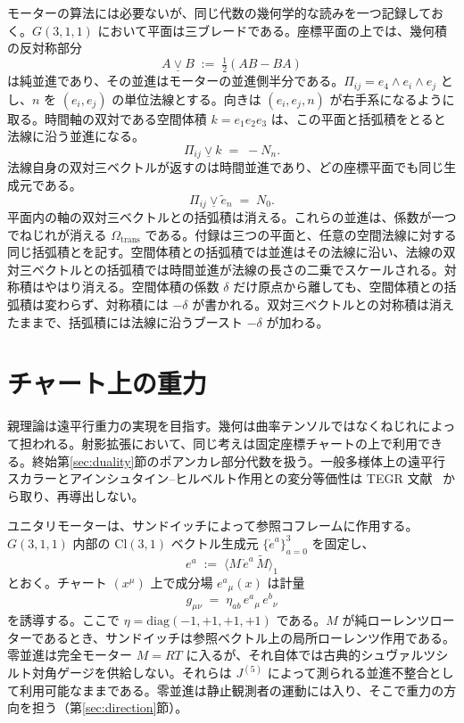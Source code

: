 \documentclass[a4paper]{article}
\begin{document}
モーターの算法には必要ないが、同じ代数の幾何学的な読みを一つ記録しておく。\(G(3,1,1)\) において平面は三ブレードである。座標平面の上では、幾何積の反対称部分
\[
A \mathbin{\underline{\vee}} B \;:=\; \tfrac12(AB-BA)
\]
は純並進であり、その並進はモーターの並進側半分である。\(\Pi_{ij}=e_{4}\wedge e_{i}\wedge e_{j}\) とし、\(n\) を \((e_{i},e_{j})\) の単位法線とする。向きは \((e_{i},e_{j},n)\) が右手系になるように取る。時間軸の双対である空間体積 \(k=e_{1}e_{2}e_{3}\) は、この平面と括弧積をとると法線に沿う並進になる。
\[
\Pi_{ij}\mathbin{\underline{\vee}} k \;=\; -N_{n}.
\]
法線自身の双対三ベクトルが返すのは時間並進であり、どの座標平面でも同じ生成元である。
\[
\Pi_{ij}\mathbin{\underline{\vee}}\tilde{e}_{n} \;=\; N_{0}.
\]
平面内の軸の双対三ベクトルとの括弧積は消える。これらの並進は、係数が一つでねじれが消える \(\Omega_{\mathrm{trans}}\) である。付録は三つの平面と、任意の空間法線に対する同じ括弧積とを記す。空間体積との括弧積では並進はその法線に沿い、法線の双対三ベクトルとの括弧積では時間並進が法線の長さの二乗でスケールされる。対称積はやはり消える。空間体積の係数 \(\delta\) だけ原点から離しても、空間体積との括弧積は変わらず、対称積には \(-\delta\) が書かれる。双対三ベクトルとの対称積は消えたままで、括弧積には法線に沿うブースト \(-\delta\) が加わる。

\section{チャート上の重力}
\label{sec:gravity}

親理論は遠平行重力の実現を目指す。幾何は曲率テンソルではなくねじれによって担われる。射影拡張において、同じ考えは固定座標チャートの上で利用できる。終始第\ref{sec:duality}節のポアンカレ部分代数を扱う。一般多様体上の遠平行スカラーとアインシュタイン--ヒルベルト作用との変分等価性は TEGR 文献~\cite{maluf2013} から取り、再導出しない。

ユニタリモーターは、サンドイッチによって参照コフレームに作用する。\(G(3,1,1)\) 内部の \(\mathrm{Cl}(3,1)\) ベクトル生成元 \(\{\mathring{e}^{a}\}_{a=0}^{3}\) を固定し、
\begin{equation}
e^{a} \;:=\; \bigl\langle M\,\mathring{e}^{a}\,\widetilde{M}\bigr\rangle_{1}
\label{eq:motor-tetrad}
\end{equation}
とおく。チャート \((x^{\mu})\) 上で成分場 \(e^{a}{}_{\mu}(x)\) は計量
\begin{equation}
g_{\mu\nu} \;=\; \eta_{ab}\, e^{a}{}_{\mu}\, e^{b}{}_{\nu}
\label{eq:induced-metric}
\end{equation}
を誘導する。ここで \(\eta=\mathrm{diag}(-1,+1,+1,+1)\) である。\(M\) が純ローレンツローターであるとき、サンドイッチは参照ベクトル上の局所ローレンツ作用である。零並進は完全モーター \(M=RT\) に入るが、それ自体では古典的シュヴァルツシルト対角ゲージを供給しない。それらは \(J^{(5)}\) によって測られる並進不整合として利用可能なままである。零並進は静止観測者の運動には入り、そこで重力の方向を担う（第\ref{sec:direction}節）。
\end{document}
